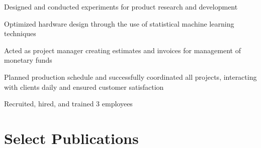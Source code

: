 \documentclass[]{deedy-resume-openfont}
\begin{document}
\begin{minipage}[t]{0.63\textwidth}
\begin{tightemize}
\item {Designed and conducted experiments for product research and development}
\item {Optimized hardware design through the use of statistical machine learning techniques}
\end{tightemize}
\sectionsep

\begin{tightemize}
\item {Acted as project manager creating estimates and invoices for management of monetary funds}
\item {Planned production schedule and successfully coordinated all projects, interacting with clients daily and ensured customer satisfaction}
\item {Recruited, hired, and trained 3 employees}
\end{tightemize}
\sectionsep

%
%



\section{Select Publications}
\renewcommand\refname{\vspace{-10mm}} %


\nocite{*}

\end{minipage}
\end{document}
